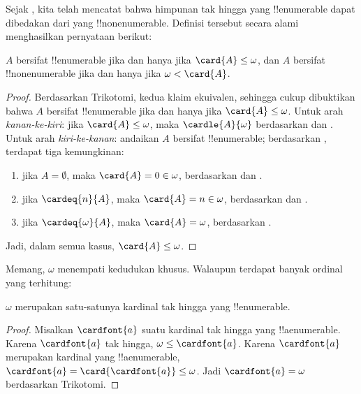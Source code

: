 \documentclass[../../../include/open-logic-section]{subfiles}
\begin{document}
Sejak , kita telah mencatat bahwa
himpunan tak hingga yang !!{enumerable} dapat dibedakan dari yang
!!{nonenumerable}. Definisi tersebut secara alami menghasilkan pernyataan
berikut:

\begin{prop}
$A$ bersifat !!{enumerable} jika dan hanya jika $\card{A} \leq \omega$, dan
$A$ bersifat !!{nonenumerable} jika dan hanya jika
$\omega < \card{A}$.
\end{prop}

\begin{proof}
Berdasarkan Trikotomi, kedua klaim ekuivalen, sehingga cukup dibuktikan bahwa
$A$ bersifat !!{enumerable} jika dan hanya jika
$\card{A} \leq \omega$. Untuk arah \emph{kanan-ke-kiri}: jika
$\card{A} \leq \omega$, maka $\cardle{A}{\omega}$ berdasarkan
 dan
. Untuk arah \emph{kiri-ke-kanan}: andaikan $A$
bersifat !!{enumerable}; berdasarkan
, terdapat tiga kemungkinan:
\begin{enumerate}
	\item jika $A = \emptyset$, maka $\card{A} = 0 \in \omega$, berdasarkan
	 dan
	.
	\item jika $\cardeq{n}{A}$, maka $\card{A} = n \in \omega$, berdasarkan
	 dan
	.
	\item jika $\cardeq{\omega}{A}$, maka $\card{A} = \omega$, berdasarkan
	.
\end{enumerate}
Jadi, dalam semua kasus, $\card{A} \leq \omega$.
\end{proof}
\noindent
Memang, $\omega$ menempati kedudukan khusus. Walaupun terdapat banyak ordinal
yang terhitung:

\begin{cor}
$\omega$ merupakan satu-satunya kardinal tak hingga yang !!{enumerable}.
\end{cor}

\begin{proof}
Misalkan $\cardfont{a}$ suatu kardinal tak hingga yang !!a{enumerable}.
Karena $\cardfont{a}$ tak hingga, $\omega \leq \cardfont{a}$. Karena
$\cardfont{a}$ merupakan kardinal yang !!a{enumerable},
$\cardfont{a} = \card{\cardfont{a}} \leq \omega$. Jadi
$\cardfont{a} = \omega$ berdasarkan Trikotomi. \end{proof}
\end{document}
